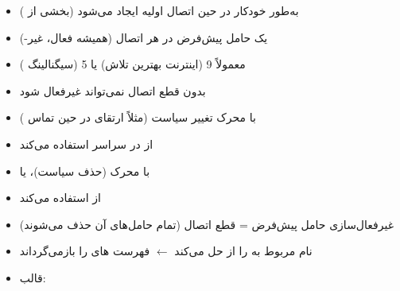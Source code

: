 

\CNchained{}

\begin{itemize}
\tightlist
\item
  به‌طور خودکار در حین اتصال اولیه ایجاد می‌شود (بخشی از )
\item
  یک حامل پیش‌فرض در هر اتصال  (همیشه فعال، غیر-)
\item
   معمولاً 9 (اینترنت بهترین تلاش) یا 5 (سیگنالینگ )
\item
  بدون قطع اتصال  نمی‌تواند غیرفعال شود
\end{itemize}





\begin{itemize}
\tightlist
\item
  با محرک تغییر سیاست  (مثلاً ارتقای  در حین تماس )
\item
  از  در سراسر  استفاده می‌کند
\end{itemize}


\begin{itemize}
\tightlist
\item
  با محرک  (حذف سیاست)،  یا 
\item
  از  استفاده می‌کند
\item
  غیرفعال‌سازی حامل پیش‌فرض = قطع اتصال  (تمام حامل‌های آن  حذف می‌شوند)
\end{itemize}



\CNchained{}

\begin{itemize}
\tightlist
\item
   نام  مربوط به  را از  حل می‌کند \ensuremath{\leftarrow}  فهرست های  را بازمی‌گرداند
\item
  قالب: 
\end{itemize}

